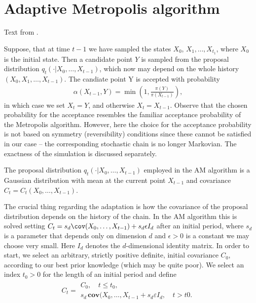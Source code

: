 \documentclass[12pt]{article}
\newcommand{\lb}{\left(}
\newcommand{\rb}{\right)}
\begin{document}
\section{Adaptive Metropolis algorithm}

Text from \cite{haario}.

Suppose, that at time $t - 1$ we have sampled the states $X_0$, $X_1, \dots, X_{t_1}$, where $X_0$ is the initial state. Then a candidate point $Y$ is sampled from the proposal distribution $q_t(\cdot | X_0, \dots, X_{t-1})$, which now may depend on the whole history $(X_0, X_1, \dots, X_{t-1})$. The candiate point Y is accepted with probability
\begin{gather}
	\alpha(X_{t-1}, Y) = \min \lb 1, \frac{\pi(Y)}{\pi(X_{t-1})} \rb,
\end{gather}
in which case we set $X_t = Y$, and otherwise $X_t = X_{t-1}$.  Observe that the chosen probability for the acceptance resembles the familiar acceptance probability of the Metropolis algorithm. However, here the choice for the acceptance probability is not based on symmetry (reversibility) conditions since these cannot be satisfied in our case -- the corresponding stochastic chain is no longer Markovian. The exactness of the simulation is discussed separately. \par
	The proposal distribution $q_t(\cdot|X_0, \dots, X_{t-1})$ employed in the AM algorithm is a Gaussian distribution with mean at the current point $X_{t-1}$ and covariance $C_t = C_t(X_0, \dots, X_{t-1})$. \par
	The crucial thing regarding the adaptation is how the covariance of the proposal distribution depends on the history of the chain. In the AM algorithm this is solved setting $C_t = s_d \cov(X_0, \dots, X_{t-1}) + s_d \epsilon I_d$ after an initial period, where $s_d$ is a parameter that depends only on dimension $d$ and $\epsilon > 0$ is a constant we may choose very small. Here $I_d$ denotes the $d$-dimensional identity matrix. In order to start, we select an arbitrary, strictly positive definite, initial covariance $C_0$, according to our best prior knowledge (which may be quite poor). We select an index $t_0 > 0$ for the length of an initial period and define
\begin{gather}
	C_t = 
	\begin{aligned}
		C_0,  \quad t \leq t_0, \\
		s_d \, \textbf{cov}( X_0, \dots, X_{t-1} + s_d \varepsilon I_d, \quad t > t0. 
	\end{aligned}
\end{gather}
\end{document}
